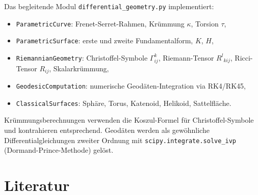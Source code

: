 \documentclass[12pt,a4paper]{amsart}
\theoremstyle{definition}
\begin{document}
Das begleitende Modul \texttt{differential\_geometry.py} implementiert:
\begin{itemize}
  \item \texttt{ParametricCurve}: Frenet-Serret-Rahmen, Krümmung $\kappa$, Torsion $\tau$,
  \item \texttt{ParametricSurface}: erste und zweite Fundamentalform, $K$, $H$,
  \item \texttt{RiemannianGeometry}: Christoffel-Symbole $\Gamma^k_{ij}$,
        Riemann-Tensor $R^l{}_{kij}$, Ricci-Tensor $R_{ij}$, Skalarkrümmung,
  \item \texttt{GeodesicComputation}: numerische Geodäten-Integration via RK4/RK45,
  \item \texttt{ClassicalSurfaces}: Sphäre, Torus, Katenoid, Helikoid, Sattelfläche.
\end{itemize}
Krümmungsberechnungen verwenden die Koszul-Formel für Christoffel-Symbole und
kontrahieren entsprechend. Geodäten werden als gewöhnliche Differentialgleichungen
zweiter Ordnung mit \texttt{scipy.integrate.solve\_ivp} (Dormand-Prince-Methode)
gelöst.

\section*{Literatur}
\end{document}
